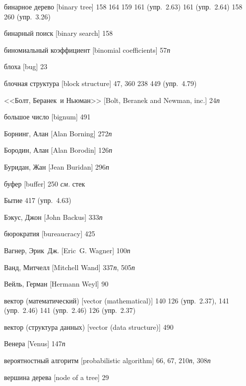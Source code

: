 \begin{theindex}
\item {бинарное дерево [binary tree]} 158
   164
   159
   161 (упр.~2.63)
   161 (упр.~2.64)
   158
   260 (упр.~3.26)
\item {бинарный поиск [binary search]} 158
\item {биномиальный коэффициент [binomial coefficients]} 57{\it п}
\item {блоха [bug]} 23
\item {блочная структура [block structure]} 47, 360
   238
   449 (упр.~4.79)
\item {<<Болт, Беранек~и Ньюман>> [Bolt, Beranek and Newman, inc.]} 24{\it п}
\item {большое число [bignum]} 491
\item {Борнинг, Алан [Alan Borning]} 272{\it п}
\item {Бородин, Алан [Alan Borodin]} 126{\it п}
\item {Буридан, Жан [Jean Buridan]} 296{\it п}
\item {буфер [buffer]}
   250
   {\it см.} стек
\item {Бытие} 417 (упр.~4.63)
\item {Бэкус, Джон [John Backus]} 333{\it п}
\item {бюрократия [bureaucracy]} 425
\bigskip
\item {Вагнер, Эрик~Дж. [Eric~G. Wagner]} 100{\it п}
\item {Ванд, Митчелл [Mitchell Wand]} 337{\it п}, 505{\it п}
\item {Вейль, Герман [Hermann Weyl]} 90
\item {вектор (математический) [vector (mathematical)]}
   140
   126 (упр.~2.37), 141 (упр.~2.46)
   141 (упр.~2.46)
   126 (упр.~2.37)
\item {вектор (структура данных) [vector (data structure)]} 490
\item {Венера [Venus]} 147{\it п}
\item {вероятностный алгоритм [probabilistic algorithm]} 66, 67, 210{\it п}, 308{\it п}
\item {вершина дерева [node of a tree]} 29

\end{theindex}
